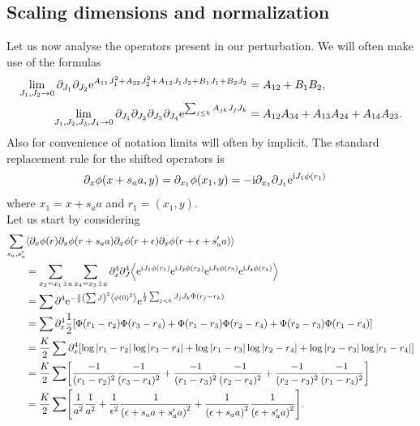 \documentclass[english, parskip=full]{scrartcl}
\begin{document}
\subsection{Scaling dimensions and normalization}
Let us now analyse the operators present in our perturbation.
We will often make use of the formulas
\begin{align}
\lim_{J_1,J_2\rightarrow 0} \partial_{J_1} \partial_{J_2} \text{e}^{A_{11}J_1^2 + A_{22}J_2^2 + A_{12} J_1J_2 + B_1J_1 + B_2J_2} &= A_{12} + B_1B_2,\\
\lim_{J_1,J_2,J_3,J_4\rightarrow 0} \partial_{J_1} \partial_{J_2} \partial_{J_3} \partial_{J_4} \text{e}^{\sum_{j\le k} A_{jk} J_jJ_k} &= A_{12} A_{34} + A_{13}A_{24} + A_{14}A_{23}.
\end{align}
Also for convenience of notation limits will often by implicit.
The standard replacement rule for the shifted operators is
\begin{align}
\partial_x\phi(x+s_aa,y) &= \partial_{x_1} \phi(x_1,y) = -\text{i}\partial_{x_1} \partial_{J_1} \text{e}^{\text{i} J_1 \phi(r_1)}
\end{align}
where $x_1=x+s_aa$ and $r_1=(x_1,y)$.\\
Let us start by considering
\begin{align}
\sum_{s_a,s_a'}&\bra*{\partial_x\phi(r) \partial_x \phi(r+s_aa) \partial_x\phi(r+\epsilon) \partial_x\phi(r+\epsilon + s_a'a)} \\
&= \sum_{x_2=x_1\pm a}\sum_{x_4=x_3\pm a} \partial_x^4 \partial_J^4 \bra*{ \powe{\i J_1\phi(r_1)} \powe{\i J_2\phi(r_2)} \powe{\i J_3\phi(r_3)} \powe{\i J_4\phi(r_4)}} \\
&= \sum \partial^4 \powe{-\frac{1}{2} \kla*{\sum J}^2 \bra*{\phi(0)^2}} \powe{\frac{1}{2} \sum_{j<k} J_jJ_k \Phi(r_j-r_k)}\\
&= \sum \partial_x^4 \frac{1}{2} \klb*{\Phi(r_1-r_2) \Phi(r_3-r_4) + \Phi(r_1-r_3) \Phi(r_2-r_4) + \Phi(r_2-r_3) \Phi(r_1-r_4)}\\
&= \frac{K}{2} \sum \partial_x^4 \klb*{\log|r_1-r_2|\log |r_3-r_4| + \log|r_1-r_3|\log |r_2-r_4| + \log|r_2-r_3|\log |r_1-r_4|}\\
&= \frac{K}{2} \sum \klb*{\frac{-1}{(r_1-r_2)^2} \frac{-1}{(r_3-r_4)^2} + \frac{-1}{(r_1-r_3)^2} \frac{-1}{(r_2-r_4)^2} + \frac{-1}{(r_2-r_3)^2} \frac{-1}{(r_1-r_4)^2}}\\
&= \frac{K}{2} \sum \klb*{ \frac{1}{a^2} \frac{1}{a^2} + \frac{1}{\epsilon^2} \frac{1}{\kla*{\epsilon+s_aa + s_a'a}^2} + \frac{1}{\kla*{\epsilon + s_aa}^2} \frac{1}{\kla*{\epsilon + s_a'a}^2}}.
\end{align}
\end{document}
